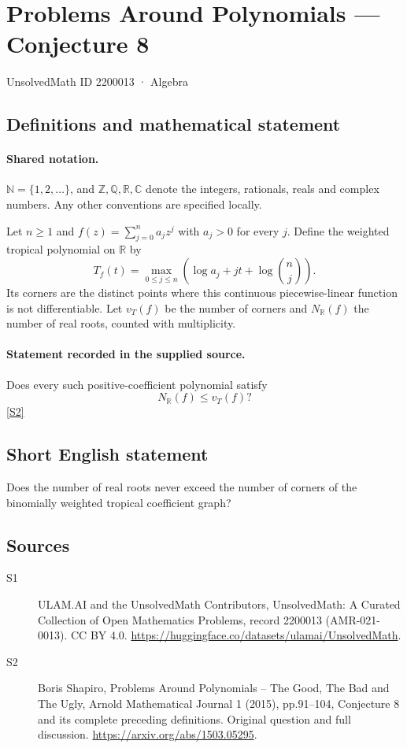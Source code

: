 \documentclass[11pt]{article}
\newcommand{\sref}[2]{\hyperlink{source:#1:#2}{[S#2]}}
\begin{document}
\setcounter{section}{2200012}
\section{Problems Around Polynomials — Conjecture 8}\label{2200013}
{\small\sffamily UnsolvedMath ID 2200013 · Algebra}
\subsection{Definitions and mathematical statement}

\paragraph{Shared notation.}$\mathbb N=\{1,2,\ldots\}$, and $\mathbb Z,\mathbb Q,\mathbb R,\mathbb C$ denote the integers, rationals, reals and complex numbers. Any other conventions are specified locally.


Let $n\geq1$ and $f(z)=\sum_{j=0}^n a_jz^j$ with $a_j>0$ for every $j$. Define the weighted tropical polynomial on $\mathbb R$ by
\[T_f(t)=\max_{0\leq j\leq n}\left(\log a_j+jt+\log\binom nj\right).\]
Its corners are the distinct points where this continuous piecewise-linear function is not differentiable. Let $v_T(f)$ be the number of corners and $N_{\mathbb R}(f)$ the number of real roots, counted with multiplicity.
\paragraph{Statement recorded in the supplied source.}
Does every such positive-coefficient polynomial satisfy
\[N_{\mathbb R}(f)\leq v_T(f)?\] \sref{2200013}{2}
\subsection{Short English statement}
Does the number of real roots never exceed the number of corners of the binomially weighted tropical coefficient graph?
\subsection{Sources}
\begin{description}
\item[\hypertarget{source:2200013:1}{S1}] ULAM.AI and the UnsolvedMath Contributors, UnsolvedMath: A Curated Collection of Open Mathematics Problems, record 2200013 (AMR-021-0013). CC BY 4.0. \url{https://huggingface.co/datasets/ulamai/UnsolvedMath}.
\item[\hypertarget{source:2200013:2}{S2}] Boris Shapiro, Problems Around Polynomials -- The Good, The Bad and The Ugly, Arnold Mathematical Journal 1 (2015), pp.91--104, Conjecture 8 and its complete preceding definitions. Original question and full discussion. \url{https://arxiv.org/abs/1503.05295}.

\end{description}
\label{end:2200013}
\end{document}
